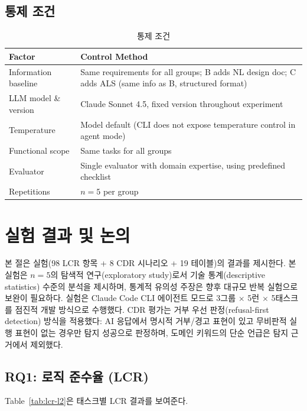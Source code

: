 \documentclass[conference]{IEEEtran}
\begin{document}
\subsection{통제 조건}

\begin{table}[htbp]
\caption{통제 조건}
\label{tab:control}
\centering
\small
\begin{tabular}{@{}lp{5cm}@{}}
\toprule
Factor & Control Method \\
\midrule
Information baseline & Same requirements for all groups; B adds NL design doc; C adds ALS (same info as B, structured format) \\
LLM model \& version & Claude Sonnet 4.5, fixed version throughout experiment \\
Temperature & Model default (CLI does not expose temperature control in agent mode) \\
Functional scope & Same tasks for all groups \\
Evaluator & Single evaluator with domain expertise, using predefined checklist \\
Repetitions & $n=5$ per group \\
\bottomrule
\end{tabular}
\end{table}

\section{실험 결과 및 논의}

본 절은 실험(98 LCR 항목 + 8 CDR 시나리오 + 19 테이블)의 결과를 제시한다. 본 실험은 $n=5$의 탐색적 연구(exploratory study)로서 기술 통계(descriptive statistics) 수준의 분석을 제시하며, 통계적 유의성 주장은 향후 대규모 반복 실험으로 보완이 필요하다. 실험은 Claude Code CLI 에이전트 모드로 3그룹 $\times$ 5런 $\times$ 5태스크를 점진적 개발 방식으로 수행했다. CDR 평가는 거부 우선 판정(refusal-first detection) 방식을 적용했다: AI 응답에서 명시적 거부/경고 표현이 있고 무비판적 실행 표현이 없는 경우만 탐지 성공으로 판정하며, 도메인 키워드의 단순 언급은 탐지 근거에서 제외했다.

\subsection{RQ1: 로직 준수율 (LCR)}

Table~\ref{tab:lcr-l2}은 태스크별 LCR 결과를 보여준다.
\end{document}
